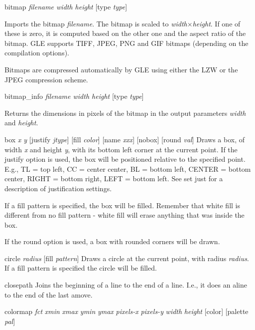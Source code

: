 \begin{commanddescription}
\item[{\sf bitmap {\it filename width height} [type {\it type}]}]

Imports the bitmap \textit{filename}. The bitmap is scaled to \textit{width}$\times$\textit{height}. If one of these is zero, it is computed based on the other one and the aspect ratio of the bitmap. GLE supports TIFF, JPEG, PNG and GIF bitmaps (depending on the compilation options).

Bitmaps are compressed automatically by GLE using either the LZW or the JPEG compression scheme.

\item[{\sf bitmap\_info {\it filename width height} [type {\it type}]}]

Returns the dimensions in pixels of the bitmap in the output parameters \textit{width} and \textit{height}.


\item[{\sf box {\it x y} [justify {\it jtype}] [fill {\it color}] [name {\it xxx}] [nobox] [round {\it val}]} ]
Draws a box, of width {\it x} and height {\it y}, with its bottom left corner
at the current point.  If the justify option is used, the box will
be positioned relative to the specified point. E.g.,  TL = top left,
CC = center center, BL = bottom left, CENTER = bottom center,
RIGHT = bottom right, LEFT = bottom left.  See {\sf set just} for a description
of justification settings.

If a fill pattern is specified, the box will be filled.
Remember that white fill is different from no fill pattern - white fill will
erase anything that was inside the box.

If the {\sf round} option is used, a box with rounded corners will be drawn.

\item[{\sf circle {\it radius} [fill {\it pattern}]} ]
  Draws a circle at the current point,
with radius {\it radius}.  If a fill
pattern is specified the circle will be filled.

\item[{\sf closepath }]
Joins the beginning of a line to the end of a line. I.e., it does an {\sf aline}
to the end of the last {\sf amove}.

\item[{\sf colormap {\it fct} {\it xmin} {\it xmax} {\it ymin} {\it ymax} {\it pixels-x} {\it pixels-y} {\it width} {\it height} [color] [palette {\it pal}]}]


\end{commanddescription}

